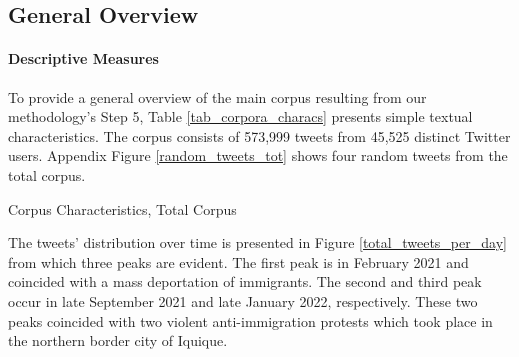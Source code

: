 \subsection{General Overview}\label{sec_res_corp}

    \paragraph{Descriptive Measures}
    
        To provide a general overview of the main corpus resulting from our methodology's Step 5, Table \ref{tab_corpora_characs} presents simple textual characteristics. The corpus consists of 573,999 tweets from 45,525 distinct Twitter users. Appendix Figure \ref{random_tweets_tot} shows four random tweets from the total corpus.
        
        
        \begin{table}[H]
            \centering
            
            
            
            \caption{Corpus Characteristics, Total Corpus}
            
            
            \label{tab_corpora_characs}
        \end{table}
        
        
        The tweets' distribution over time is presented in Figure \ref{total_tweets_per_day} from which three peaks are evident. The first peak is in February 2021 and coincided with a mass deportation of immigrants. The second and third peak occur in late September 2021 and late January 2022, respectively. These two peaks coincided with two violent anti-immigration protests which took place in the northern border city of Iquique.
        
